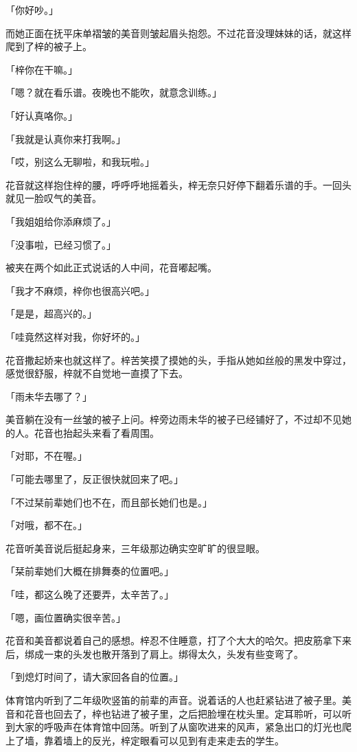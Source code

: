 \documentclass[UTF8]{ctexart}
\begin{document}
    「你好吵。」

    而她正面在抚平床单褶皱的美音则皱起眉头抱怨。不过花音没理妹妹的话，就这样爬到了梓的被子上。

    「梓你在干嘛。」

    「嗯？就在看乐谱。夜晚也不能吹，就意念训练。」

    「好认真咯你。」

    「我就是认真你来打我啊。」

    「哎，别这么无聊啦，和我玩啦。」

    花音就这样抱住梓的腰，呼呼呼地摇着头，梓无奈只好停下翻着乐谱的手。一回头就见一脸叹气的美音。

    「我姐姐给你添麻烦了。」

    「没事啦，已经习惯了。」

    被夹在两个如此正式说话的人中间，花音嘟起嘴。

    「我才不麻烦，梓你也很高兴吧。」

    「是是，超高兴的。」

    「哇竟然这样对我，你好坏的。」

    花音撒起娇来也就这样了。梓苦笑摸了摸她的头，手指从她如丝般的黑发中穿过，感觉很舒服，梓就不自觉地一直摸了下去。

    「雨未华去哪了？」

    美音躺在没有一丝皱的被子上问。梓旁边雨未华的被子已经铺好了，不过却不见她的人。花音也抬起头来看了看周围。

    「对耶，不在喔。」

    「可能去哪里了，反正很快就回来了吧。」

    「不过栞前辈她们也不在，而且部长她们也是。」

    「对哦，都不在。」

    花音听美音说后挺起身来，三年级那边确实空旷旷的很显眼。

    「栞前辈她们大概在排舞奏的位置吧。」

    「哇，都这么晚了还要弄，太辛苦了。」

    「嗯，画位置确实很辛苦。」

    花音和美音都说着自己的感想。梓忍不住睡意，打了个大大的哈欠。把皮筋拿下来后，绑成一束的头发也散开落到了肩上。绑得太久，头发有些变弯了。

    「到熄灯时间了，请大家回各自的位置。」

    体育馆内听到了二年级吹竖笛的前辈的声音。说着话的人也赶紧钻进了被子里。美音和花音也回去了，梓也钻进了被子里，之后把脸埋在枕头里。定耳聆听，可以听到大家的呼吸声在体育馆中回荡。听到了从窗吹进来的风声，紧急出口的灯光也爬上了墙，靠着墙上的反光，梓定眼看可以见到有走来走去的学生。
\end{document}
